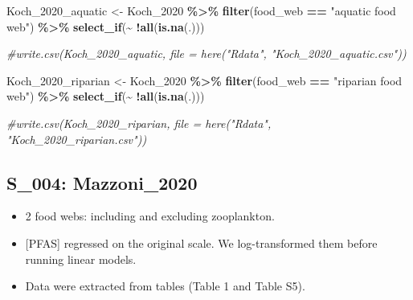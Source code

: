 \documentclass[
]{article}
\newenvironment{Shaded}{\begin{snugshade}}{\end{snugshade}}
\newcommand{\CommentTok}[1]{\textcolor[rgb]{0.56,0.35,0.01}{\textit{#1}}}
\newcommand{\FunctionTok}[1]{\textcolor[rgb]{0.13,0.29,0.53}{\textbf{#1}}}
\newcommand{\NormalTok}[1]{#1}
\newcommand{\OtherTok}[1]{\textcolor[rgb]{0.56,0.35,0.01}{#1}}
\newcommand{\SpecialCharTok}[1]{\textcolor[rgb]{0.81,0.36,0.00}{\textbf{#1}}}
\newcommand{\StringTok}[1]{\textcolor[rgb]{0.31,0.60,0.02}{#1}}
\providecommand{\tightlist}{%
  \setlength{\itemsep}{0pt}\setlength{\parskip}{0pt}}
\begin{document}
\begin{Shaded}
\begin{Highlighting}[]
\NormalTok{Koch\_2020\_aquatic }\OtherTok{\textless{}{-}}\NormalTok{ Koch\_2020 }\SpecialCharTok{\%\textgreater{}\%} 
  \FunctionTok{filter}\NormalTok{(food\_web }\SpecialCharTok{==} \StringTok{"aquatic food web"}\NormalTok{) }\SpecialCharTok{\%\textgreater{}\%}
  \FunctionTok{select\_if}\NormalTok{(}\SpecialCharTok{\textasciitilde{}} \SpecialCharTok{!}\FunctionTok{all}\NormalTok{(}\FunctionTok{is.na}\NormalTok{(.)))}
  
\CommentTok{\#write.csv(Koch\_2020\_aquatic, file = here("Rdata", "Koch\_2020\_aquatic.csv"))}

\NormalTok{Koch\_2020\_riparian }\OtherTok{\textless{}{-}}\NormalTok{ Koch\_2020 }\SpecialCharTok{\%\textgreater{}\%} 
  \FunctionTok{filter}\NormalTok{(food\_web }\SpecialCharTok{==} \StringTok{"riparian food web"}\NormalTok{) }\SpecialCharTok{\%\textgreater{}\%}
  \FunctionTok{select\_if}\NormalTok{(}\SpecialCharTok{\textasciitilde{}} \SpecialCharTok{!}\FunctionTok{all}\NormalTok{(}\FunctionTok{is.na}\NormalTok{(.)))}

\CommentTok{\#write.csv(Koch\_2020\_riparian, file = here("Rdata", "Koch\_2020\_riparian.csv"))}
\end{Highlighting}
\end{Shaded}

\subsection{S\_004: Mazzoni\_2020}\label{s_004-mazzoni_2020}

\begin{itemize}
\tightlist
\item
  2 food webs: including and excluding zooplankton.
\item
  {[}PFAS{]} regressed on the original scale. We log-transformed them
  before running linear models.
\item
  Data were extracted from tables (Table 1 and Table S5).
\end{itemize}
\end{document}
